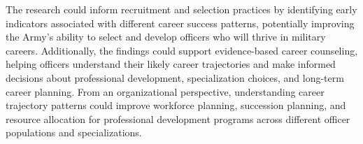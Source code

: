 \documentclass[main.tex]{subfiles}
\begin{document}
The research could inform recruitment and selection practices by identifying early indicators associated with different career success patterns, potentially improving the Army's ability to select and develop officers who will thrive in military careers. Additionally, the findings could support evidence-based career counseling, helping officers understand their likely career trajectories and make informed decisions about professional development, specialization choices, and long-term career planning. From an organizational perspective, understanding career trajectory patterns could improve workforce planning, succession planning, and resource allocation for professional development programs across different officer populations and specializations.

\end{document}
